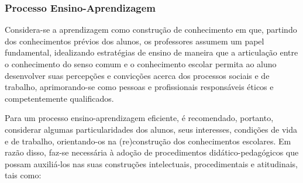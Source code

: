 \subsubsection{Processo Ensino-Aprendizagem}

Considera-se a aprendizagem como construção de conhecimento em que, partindo dos conhecimentos prévios dos alunos, os professores assumem um papel fundamental, idealizando estratégias de ensino de maneira que a articulação entre o conhecimento do senso comum e o conhecimento escolar permita ao aluno desenvolver suas percepções e convicções acerca dos processos sociais e de trabalho, aprimorando-se como pessoas e profissionais responsáveis éticos e competentemente qualificados.

Para um processo ensino-aprendizagem eficiente, é recomendado, portanto, considerar algumas particularidades dos alunos, seus interesses, condições de vida e de trabalho, orientando-os na (re)construção dos conhecimentos escolares. Em razão disso, faz-se necessária à adoção de procedimentos didático-pedagógicos que possam auxiliá-los nas suas construções intelectuais, procedimentais e atitudinais, tais como:

